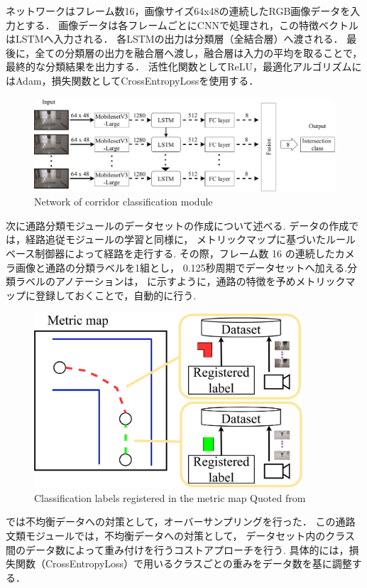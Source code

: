 ネットワークはフレーム数16，画像サイズ64x48の連続したRGB画像データを入力とする．
画像データは各フレームごとにCNNで処理され，この特徴ベクトルはLSTMへ入力される．
各LSTMの出力は分類層（全結合層）へ渡される．
最後に，全ての分類層の出力を融合層へ渡し，融合層は入力の平均を取ることで，
最終的な分類結果を出力する．
活性化関数としてReLU，最適化アルゴリズムにはAdam，損失関数としてCrossEntropyLossを使用する．
\begin{figure}[htbp]
    \centering
     \includegraphics[width=120mm]{images/pdf/network-intersect.pdf}
     \caption{Network of corridor classification module}
     \label{fig:int_net}
\end{figure}

\newpage
次に通路分類モジュールのデータセットの作成について述べる.
データの作成では，経路追従モジュールの学習と同様に，
メトリックマップに基づいたルールベース制御器によって経路を走行する.
その際，フレーム数 16 の連続したカメラ画像と通路の分類ラベルを1組とし，
0.125秒周期でデータセットへ加える.分類ラベルのアノテーションは，
に示すように，通路の特徴を予めメトリックマップに登録しておくことで，自動的に行う.
\begin{figure}[htbp]
    \centering
     \includegraphics[width=100mm]{images/pdf/map_label.pdf}
     \caption{Classification labels registered in the metric map Quoted from \cite{haruyama2023}}
     \label{fig:int_net}
\end{figure}

では不均衡データへの対策として，オーバーサンプリングを行った．
この通路文類モジュールでは，不均衡データへの対策として，
データセット内のクラス間のデータ数によって重み付けを行うコストアプローチ\cite{cost}を行う.
具体的には，損失関数（CrossEntropyLoss）で用いるクラスごとの重みをデータ数を基に調整する．